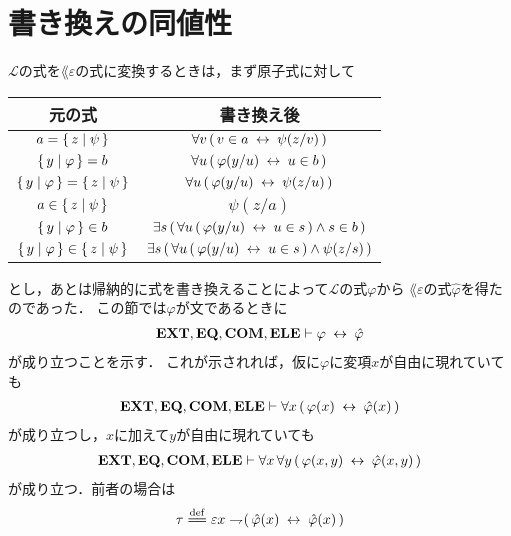 \section{書き換えの同値性}
\label{sec:equivalence_of_formula_rewriting}
	$\mathcal{L}$の式を$\lang{\varepsilon}$の式に変換するときは，まず原子式に対して
	\begin{table}[H]
		\begin{center}
		\begin{tabular}{c|c}
			元の式 & 書き換え後 \\ \hline \hline
			$a = \left\{\, z \mid \psi\, \right\}$ & $\forall v\, (\, v \in a \hspace{0.25em}\leftrightarrow\hspace{0.25em} \psi(z/v)\, )$ \\ \hline
			$\left\{\, y \mid \varphi\, \right\} = b$ & $\forall u\, (\, \varphi(y/u) \hspace{0.25em}\leftrightarrow\hspace{0.25em} u \in b\, )$ \\ \hline
			$\left\{\, y \mid \varphi\, \right\} = \left\{\, z \mid \psi\, \right\}$ & $\forall u\, (\, \varphi(y/u) \hspace{0.25em}\leftrightarrow\hspace{0.25em} \psi(z/u)\, )$ \\ \hline
			$a \in \left\{\, z \mid \psi\, \right\}$ & $\psi(z/a)$ \\ \hline
			$\left\{\, y \mid \varphi\, \right\} \in b$ & $\exists s\, (\, \forall u\, (\, \varphi(y/u) \hspace{0.25em}\leftrightarrow\hspace{0.25em} u \in s\, ) \wedge s \in b\, )$ \\ \hline
			$\left\{\, y \mid \varphi\, \right\} \in \left\{\, z \mid \psi\, \right\}$ & $\exists s\, (\, \forall u\, (\, \varphi(y/u) \hspace{0.25em}\leftrightarrow\hspace{0.25em} u \in s\, ) \wedge \psi(z/s)\, )$ \\ \hline
		\end{tabular}
		\end{center}
	\end{table}
	とし，あとは帰納的に式を書き換えることによって$\mathcal{L}$の式$\varphi$から
	$\lang{\varepsilon}$の式$\hat{\varphi}$を得たのであった．
	この節では$\varphi$が文であるときに
	\begin{align}
		\mbox{{\bf EXT}},\mbox{{\bf EQ}},\mbox{\bf COM},\mbox{{\bf ELE}} \vdash \varphi \hspace{0.25em}\leftrightarrow\hspace{0.25em} \hat{\varphi}
		\label{formula_rewriting_1}
	\end{align}
	が成り立つことを示す．
	これが示されれば，仮に$\varphi$に変項$x$が自由に現れていても
	\begin{align}
		\mbox{{\bf EXT}},\mbox{{\bf EQ}},\mbox{\bf COM},\mbox{{\bf ELE}} \vdash \forall x\, (\, \varphi(x) \hspace{0.25em}\leftrightarrow\hspace{0.25em} \hat{\varphi}(x)\, )
	\end{align}
	が成り立つし，$x$に加えて$y$が自由に現れていても
	\begin{align}
		\mbox{{\bf EXT}},\mbox{{\bf EQ}},\mbox{\bf COM},\mbox{{\bf ELE}} \vdash \forall x\, \forall y\, (\, \varphi(x,y) \hspace{0.25em}\leftrightarrow\hspace{0.25em} \hat{\varphi}(x,y)\, )
	\end{align}
	が成り立つ．前者の場合は
	\begin{align}
		\tau \defeq \varepsilon x \negation (\, \hat{\varphi}(x) \lrarrow \hat{\varphi}(x)\, )
	\end{align}
